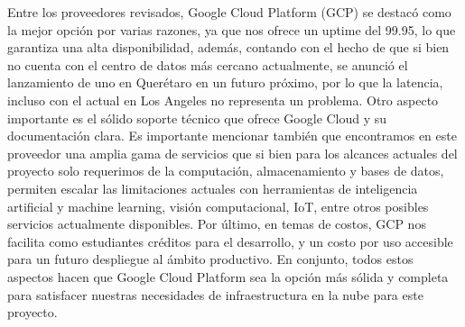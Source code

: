 %
Entre los proveedores revisados, Google Cloud Platform (GCP) se destacó como la mejor opción por varias razones, ya que nos ofrece un uptime del 99.95, lo que garantiza una alta disponibilidad, además, contando con el hecho de que si bien no cuenta con el centro de datos más cercano actualmente, se anunció el lanzamiento de uno en Querétaro en un futuro próximo, por lo que la latencia, incluso con el actual en Los Angeles no representa un problema. Otro aspecto importante es el sólido soporte técnico que ofrece Google Cloud y su documentación clara. Es importante mencionar también que encontramos en este proveedor una amplia gama de servicios que si bien para los alcances actuales del proyecto solo requerimos de la computación, almacenamiento y bases de datos, permiten escalar las limitaciones actuales con herramientas de inteligencia artificial y machine learning, visión computacional, IoT, entre otros posibles servicios actualmente disponibles. Por último, en temas de costos, GCP nos facilita como estudiantes créditos para el desarrollo, y un costo por uso accesible para un futuro despliegue al ámbito productivo. En conjunto, todos estos aspectos hacen que Google Cloud Platform sea la opción más sólida y completa para satisfacer nuestras necesidades de infraestructura en la nube para este proyecto.\\

